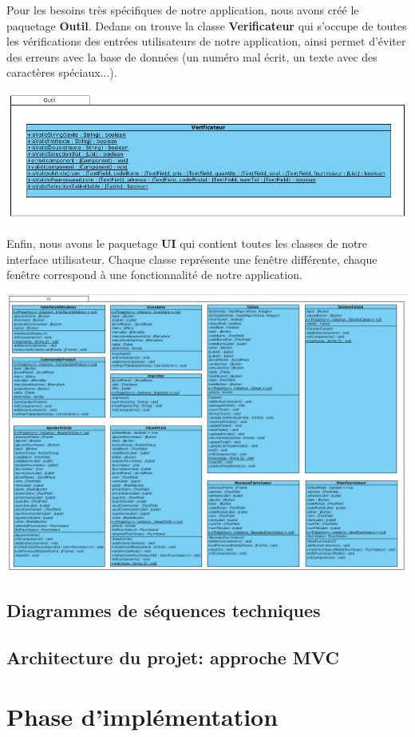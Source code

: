 Pour les besoins très spécifiques de notre application, nous avons créé le paquetage \textbf{Outil}. Dedans on trouve la classe \textbf{Verificateur} qui s'occupe de toutes les vérifications des entrées utilisateurs de notre application, ainsi permet d'éviter des erreurs avec la base de données (un numéro mal écrit, un texte avec des caractères spéciaux...).

\begin{center}
\includegraphics[width=14cm]{./Conception/outil}
\end{center}

Enfin, nous avons le paquetage \textbf{UI} qui contient toutes les classes de notre interface utilisateur. Chaque classe représente une fenêtre différente, chaque fenêtre correspond à une fonctionnalité de notre application.

\begin{center}
\includegraphics[width=14cm]{./Conception/ui}
\end{center}


\section{Diagrammes de séquences techniques}

\section{Architecture du projet: approche MVC}


\chapter{Phase d'implémentation}